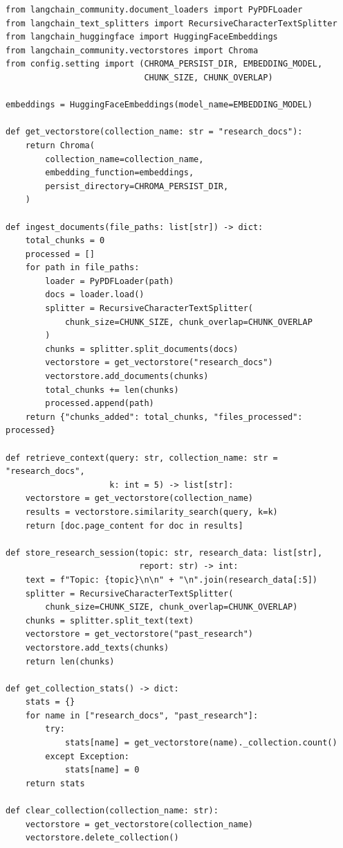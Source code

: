 \documentclass[11pt, a4paper]{article}
\begin{document}
\begin{lstlisting}[style=pythonstyle, caption={rag/vector\_store.py --- Key Functions}]
from langchain_community.document_loaders import PyPDFLoader
from langchain_text_splitters import RecursiveCharacterTextSplitter
from langchain_huggingface import HuggingFaceEmbeddings
from langchain_community.vectorstores import Chroma
from config.setting import (CHROMA_PERSIST_DIR, EMBEDDING_MODEL,
                            CHUNK_SIZE, CHUNK_OVERLAP)

embeddings = HuggingFaceEmbeddings(model_name=EMBEDDING_MODEL)

def get_vectorstore(collection_name: str = "research_docs"):
    return Chroma(
        collection_name=collection_name,
        embedding_function=embeddings,
        persist_directory=CHROMA_PERSIST_DIR,
    )

def ingest_documents(file_paths: list[str]) -> dict:
    total_chunks = 0
    processed = []
    for path in file_paths:
        loader = PyPDFLoader(path)
        docs = loader.load()
        splitter = RecursiveCharacterTextSplitter(
            chunk_size=CHUNK_SIZE, chunk_overlap=CHUNK_OVERLAP
        )
        chunks = splitter.split_documents(docs)
        vectorstore = get_vectorstore("research_docs")
        vectorstore.add_documents(chunks)
        total_chunks += len(chunks)
        processed.append(path)
    return {"chunks_added": total_chunks, "files_processed": processed}

def retrieve_context(query: str, collection_name: str = "research_docs",
                     k: int = 5) -> list[str]:
    vectorstore = get_vectorstore(collection_name)
    results = vectorstore.similarity_search(query, k=k)
    return [doc.page_content for doc in results]

def store_research_session(topic: str, research_data: list[str],
                           report: str) -> int:
    text = f"Topic: {topic}\n\n" + "\n".join(research_data[:5])
    splitter = RecursiveCharacterTextSplitter(
        chunk_size=CHUNK_SIZE, chunk_overlap=CHUNK_OVERLAP)
    chunks = splitter.split_text(text)
    vectorstore = get_vectorstore("past_research")
    vectorstore.add_texts(chunks)
    return len(chunks)

def get_collection_stats() -> dict:
    stats = {}
    for name in ["research_docs", "past_research"]:
        try:
            stats[name] = get_vectorstore(name)._collection.count()
        except Exception:
            stats[name] = 0
    return stats

def clear_collection(collection_name: str):
    vectorstore = get_vectorstore(collection_name)
    vectorstore.delete_collection()
\end{lstlisting}
\end{document}
